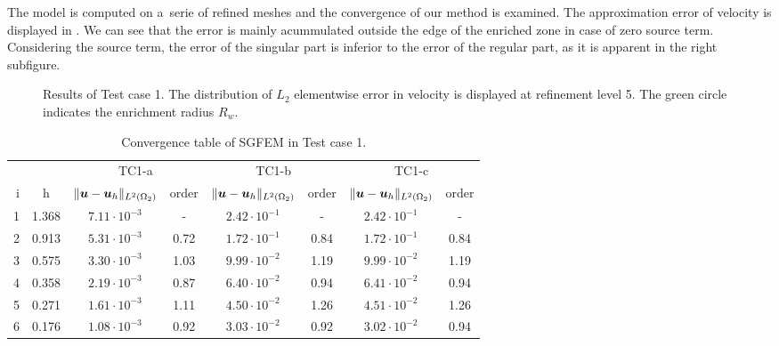 The model is computed on a~serie of refined meshes and the convergence of our method is examined.
The approximation error of velocity is displayed in . We can see that 
the error is mainly acummulated outside the edge of the enriched zone in case of zero source term.
Considering the source term, the error of the singular part is inferior to the error of the regular part, as it is apparent
in the right subfigure.
%
\begin{figure}[!htb]
    \centering
    \caption
    {Results of Test case 1. The distribution of $L_2$ elementwise error in velocity is displayed at refinement level 5.
    The green circle indicates the enrichment radius $R_w$.}
    \label{fig:mh_tc1_error}
\end{figure}
%
%
%
\begin{table}[!htb]
\begin{center}
\bgroup
\def\arraystretch{1.2}
\setlength\tabcolsep{5pt}
\begin{tabular}{rc|cc|cc|cc}
\toprule
\multicolumn{2}{c|}{} & \multicolumn{2}{c|}{ TC1-a} & \multicolumn{2}{c|}{TC1-b} & \multicolumn{2}{c}{TC1-c}\\ [3pt] %
i & h & $\|\mathbf{\boldsymbol{u}}-\mathbf{\boldsymbol{u}}_h\|_{L^2(\Omega_2)}$ & order & $\|\mathbf{\boldsymbol{u}}-\mathbf{\boldsymbol{u}}_h\|_{L^2(\Omega_2)}$
    & order & $\|\mathbf{\boldsymbol{u}}-\mathbf{\boldsymbol{u}}_h\|_{L^2(\Omega_2)}$ & order \\ [3pt] \midrule
1 & 1.368 &  $7.11\cdot10^{-3}$  &  -   &  $2.42\cdot10^{-1}$  &  -   &  $2.42\cdot10^{-1}$ &   -   \\
2 & 0.913 &  $5.31\cdot10^{-3}$  & 0.72 &  $1.72\cdot10^{-1}$  & 0.84 &  $1.72\cdot10^{-1}$ &  0.84 \\
3 & 0.575 &  $3.30\cdot10^{-3}$  & 1.03 &  $9.99\cdot10^{-2}$  & 1.19 &  $9.99\cdot10^{-2}$ &  1.19 \\
4 & 0.358 &  $2.19\cdot10^{-3}$  & 0.87 &  $6.40\cdot10^{-2}$  & 0.94 &  $6.41\cdot10^{-2}$ &  0.94 \\
5 & 0.271 &  $1.61\cdot10^{-3}$  & 1.11 &  $4.50\cdot10^{-2}$  & 1.26 &  $4.51\cdot10^{-2}$ &  1.26 \\
6 & 0.176 &  $1.08\cdot10^{-3}$  & 0.92 &  $3.03\cdot10^{-2}$  & 0.92 &  $3.02\cdot10^{-2}$ &  0.94 \\
\bottomrule
\end{tabular}
\caption{Convergence table of SGFEM in Test case 1.}
\label{tab:mh_tc1_convergence}
\egroup
\end{center}
\end{table}


